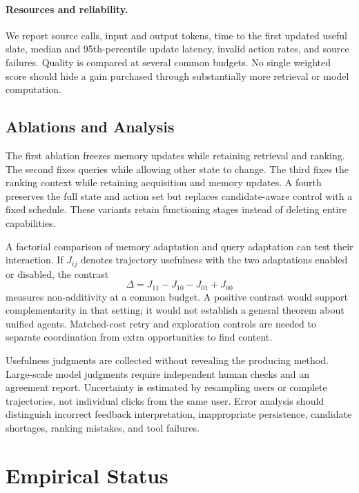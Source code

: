 \documentclass[11pt]{article}
\begin{document}
\paragraph{Resources and reliability.}
We report source calls, input and output tokens, time to the first updated useful slate, median and 95th-percentile update latency, invalid action rates, and source failures. Quality is compared at several common budgets. No single weighted score should hide a gain purchased through substantially more retrieval or model computation.

\subsection{Ablations and Analysis}

The first ablation freezes memory updates while retaining retrieval and ranking. The second fixes queries while allowing other state to change. The third fixes the ranking context while retaining acquisition and memory updates. A fourth preserves the full state and action set but replaces candidate-aware control with a fixed schedule. These variants retain functioning stages instead of deleting entire capabilities.

A factorial comparison of memory adaptation and query adaptation can test their interaction. If $J_{ij}$ denotes trajectory usefulness with the two adaptations enabled or disabled, the contrast
\begin{equation}
\Delta=J_{11}-J_{10}-J_{01}+J_{00}
\end{equation}
measures non-additivity at a common budget. A positive contrast would support complementarity in that setting; it would not establish a general theorem about unified agents. Matched-cost retry and exploration controls are needed to separate coordination from extra opportunities to find content.

Usefulness judgments are collected without revealing the producing method. Large-scale model judgments require independent human checks and an agreement report. Uncertainty is estimated by resampling users or complete trajectories, not individual clicks from the same user. Error analysis should distinguish incorrect feedback interpretation, inappropriate persistence, candidate shortages, ranking mistakes, and tool failures.

\section{Empirical Status}
\label{sec:status}
\end{document}
